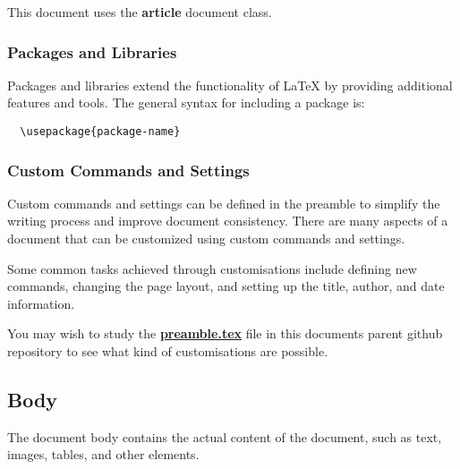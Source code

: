 \documentclass[12pt]{article}
\begin{document}
  This document uses the \textbf{article} document class.

 
  \subsubsection{Packages and Libraries}
  \label{sec:packages-and-libraries}

  Packages and libraries extend the functionality of LaTeX by providing additional features and tools. The general syntax for including a package is:

  \begin{verbatim}
  \usepackage{package-name}
  \end{verbatim}


  \subsubsection{Custom Commands and Settings}
  \label{sec:custom-commands-and-settings}


Custom commands and settings can be defined in the preamble to simplify the writing process and improve document consistency. 
There are many aspects of a document that can be customized using custom commands and settings. 


Some common tasks achieved through customisations include defining new commands, changing the page layout, 
and setting up the title, author, and date information.

You may wish to study the \textbf{
  \href{https://github.com/mike-shields-dev/University_of_Bolton_LaTeX_Assignment_Template/blob/main/preamble.tex}{preamble.tex}
} file in this documents parent github repository to see what kind of customisations are possible. 


  \subsection{Body}
  \label{sec:body}

  The document body contains the actual content of the document, such as text, images, tables, and other elements.
\end{document}
